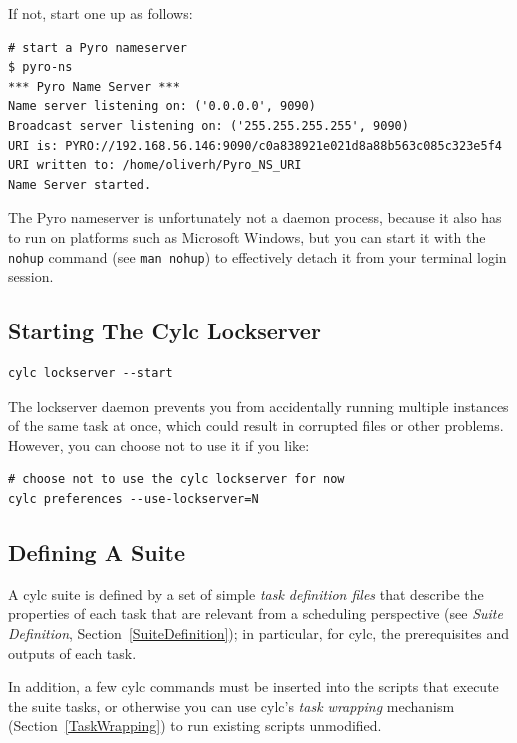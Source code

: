 \documentclass[11pt,a4paper]{article}
\begin{document}
If not, start one up as follows:

\begin{lstlisting}
# start a Pyro nameserver
$ pyro-ns
*** Pyro Name Server ***
Name server listening on: ('0.0.0.0', 9090)
Broadcast server listening on: ('255.255.255.255', 9090)
URI is: PYRO://192.168.56.146:9090/c0a838921e021d8a88b563c085c323e5f4
URI written to: /home/oliverh/Pyro_NS_URI
Name Server started.
\end{lstlisting}

The Pyro nameserver is unfortunately not a daemon process, because it
also has to run on platforms such as Microsoft Windows, but you can
start it with the \lstinline=nohup= command 
(see \lstinline=man nohup=) to effectively detach it from your terminal
login session.

\subsection{Starting The Cylc Lockserver}
\label{QuickStartingTheCylcLockserver}

\begin{lstlisting}
cylc lockserver --start
\end{lstlisting}

The lockserver daemon prevents you from accidentally running multiple
instances of the same task at once, which could result in corrupted
files or other problems. However, you can choose not to use it if you
like:

\begin{lstlisting}
# choose not to use the cylc lockserver for now
cylc preferences --use-lockserver=N
\end{lstlisting}


\subsection{Defining A Suite} 
\label{QuickDefiningASuite}

A cylc suite is defined by a set of simple {\em task definition files}
that describe the properties of each task that are relevant from a
scheduling perspective (see {\em Suite Definition},
Section~\ref{SuiteDefinition}); in particular, for cylc, the
prerequisites and outputs of each task.

In addition, a few cylc commands must be inserted into the scripts that
execute the suite tasks, or otherwise you can use cylc's {\em task
wrapping} mechanism (Section~\ref{TaskWrapping}) to run existing scripts
unmodified.
\end{document}
